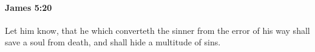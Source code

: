 		\paragraph{James 5:20} %
			\label{JAMES-5-20}

			Let him know, that he which converteth the sinner from the error of his way shall save a soul from death, and shall hide a multitude of sins.

			\begin{framed}
			\scriptsize
				\begin{compactdesc}
					\item[SBLG] 
				\end{compactdesc}
			\end{framed}